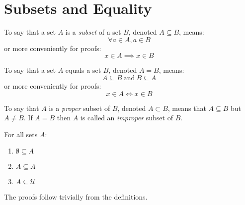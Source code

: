 \documentclass[letterpaper,12pt,fleqn]{article}
\newcommand{\U}{\mathcal{U}}
\newcommand{\E}{\emptyset}
\begin{document}
\section*{Subsets and Equality}
\begin{definition}
To say that a set $A$ is a \emph{subset} of a set $B$, denoted $A\subseteq B$,
means:
\[\forall a\in A,a\in B\]
or more conveniently for proofs:
\[x\in A\implies x\in B\]
\end{definition}
\begin{definition}
To say that a set $A$ equals a set $B$, denoted $A=B$, means:
\[A\subseteq B\ \mbox{and}\ B\subseteq A\]
or more conveniently for proofs:
\[x\in A\iff x\in B\]
\end{definition}
\begin{definition}
To say that $A$ is a \emph{proper} subset of $B$, denoted $A\subset B$, means
that $A\subseteq B$ but $A\ne B$. If $A=B$ then $A$ is called an \emph{improper}
subset of $B$.
\end{definition}
\begin{theorem}
For all sets $A$:
\begin{enumerate}
\item $\E\subseteq A$
\item $A\subseteq A$
\item $A\subseteq\U$
\end{enumerate}
The proofs follow trivially from the definitions.
\end{theorem}
\end{document}
